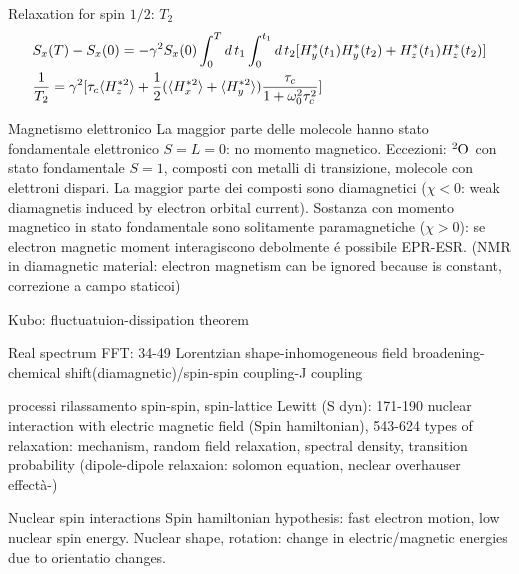\begin{frame}{Relaxation for spin $1/2$: $T_2$}
\begin{align*}
&S_x(T)-S_x(0)=-\gamma^2S_x(0)\int_0^Td\,t_1\int_0^{t_1}d\,t_2[H_y^*(t_1)H_y^*(t_2)+H_z^*(t_1)H_z^*(t_2)]\\
&\frac{1}{T_2}=\gamma^2[\tau_c\langle H_z^{*2} \rangle+\frac{1}{2}(\langle H_x^{*2} \rangle+\langle H_y^{*2} \rangle)\frac{\tau_c}{1+\omega_0^2\tau_c^2}]
\end{align*}
\end{frame}

\begin{wordonframe}{Magnetismo elettronico}
La maggior parte delle molecole hanno stato fondamentale elettronico $S=L=0$: no momento magnetico. Eccezioni: $\cel{O}{2}{}{}$ con stato fondamentale $S=1$, composti con metalli di transizione, molecole con elettroni dispari.
La maggior parte dei composti sono diamagnetici ($\chi<0$: weak diamagnetis induced by electron orbital current).
Sostanza con momento magnetico in stato fondamentale sono solitamente paramagnetiche ($\chi>0$): se electron magnetic moment interagiscono debolmente \'e possibile EPR-ESR.
(NMR in diamagnetic material: electron magnetism can be ignored because is constant, correzione a campo staticoi)
\end{wordonframe}

\begin{wordonframe}{Kubo: fluctuatuion-dissipation theorem}

\end{wordonframe}

\begin{wordonframe}{Real spectrum FFT: 34-49}
Lorentzian shape-inhomogeneous field broadening-chemical shift(diamagnetic)/spin-spin coupling-J coupling
\end{wordonframe}

\begin{wordonframe}{processi rilassamento spin-spin, spin-lattice}
Lewitt (S dyn): 171-190 nuclear interaction with electric magnetic field (Spin hamiltonian), 543-624 types of relaxation: mechanism, random field relaxation, spectral density, transition probability (dipole-dipole relaxaion: solomon equation, neclear overhauser effectà-)
\end{wordonframe}

\begin{wordonframe}{Nuclear spin interactions}
Spin hamiltonian hypothesis: fast electron motion, low nuclear spin energy.
Nuclear shape, rotation: change in electric/magnetic energies due to orientatio changes.
\end{wordonframe}

